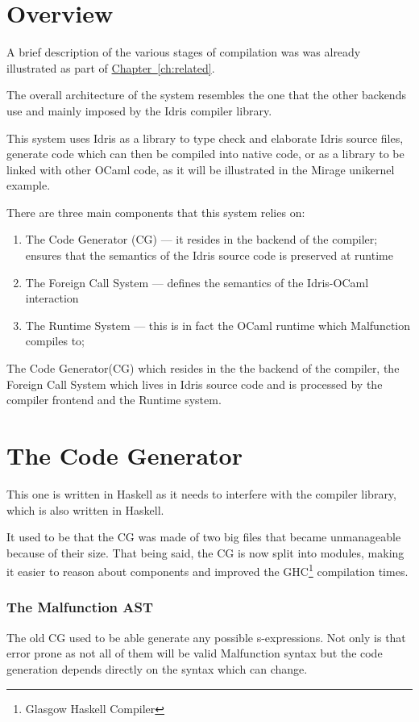 
\section{Overview}
A brief description of the various stages of compilation was
was already illustrated as part of \hyperref[ch:related]{Chapter~\ref{ch:related}}.

The overall architecture of the system
resembles the one that the other backends use and mainly
imposed by the Idris compiler library.

This system uses Idris as
a library to type check and elaborate Idris source files,
generate code which can then be compiled into native code,
or as a library to be linked with other OCaml code, as
it will be illustrated in the Mirage unikernel example.

There are three main components that this system relies on:
\begin{enumerate}
    \item The Code Generator (CG) --- it resides in the
          backend of the compiler; ensures that the semantics
          of the Idris source code is preserved at runtime
    \item The Foreign Call System --- defines the semantics
          of the Idris-OCaml interaction
    \item The Runtime System --- this is in fact the OCaml
          runtime which Malfunction compiles to;
\end{enumerate}
The Code Generator(CG) which resides in the
the backend of the compiler, the Foreign Call System which
lives in Idris source code and is processed by the compiler
frontend and the Runtime system.

\section{The Code Generator}
This one is written in Haskell as it needs to interfere
with the compiler library, which is also written in Haskell.

It used to be that the CG was made of two big files that became
unmanageable because of their size.
That being said, the CG is now split into modules, making
it easier to reason about components and improved the
GHC\footnote{Glasgow Haskell Compiler} compilation times.

\subsubsection{The Malfunction AST}
The old CG used to be able generate any possible
s-expressions. Not only is that error prone as not all of them
will be valid Malfunction syntax but the code generation
depends directly on the syntax which can change.

